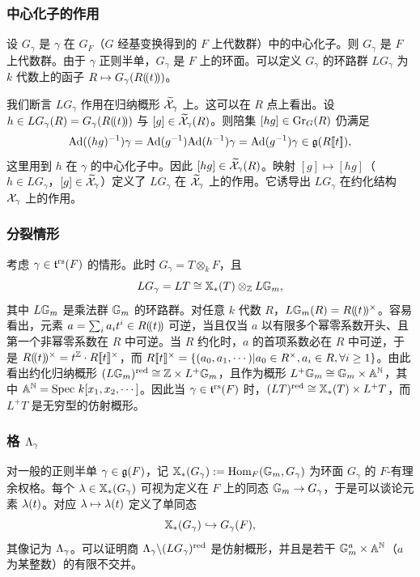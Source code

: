 \subsubsection{中心化子的作用}\label{sss:centralizer} 设 $G_{\gamma}$ 是 $\gamma$ 在 $G_{F}$（$G$ 经基变换得到的 $F$ 上代数群）中的中心化子。则 $G_{\gamma}$ 是 $F$ 上代数群。由于 $\gamma$ 正则半单，$G_{\gamma}$ 是 $F$ 上的环面。可以定义 $G_{\gamma}$ 的环路群 $LG_{\gamma}$ 为 $k$ 代数上的函子 $R\mapsto G_{\gamma}(R(\!(t)\!))$。

我们断言 $LG_{\gamma}$ 作用在归纳概形 $\widetilde{\mathcal{X}}_{\gamma}$ 上。这可以在 $R$ 点上看出。设 $h\in LG_{\gamma}(R)=G_{\gamma}(R(\!(t)\!))$ 与 $[g]\in \widetilde{\mathcal{X}}_{\gamma}(R)$。则陪集 $[hg]\in \textup{Gr}_{G}(R)$ 仍满足
\begin{equation*}
\textup{Ad}((hg)^{-1})\gamma=\textup{Ad}(g^{-1})\textup{Ad}(h^{-1})\gamma=\textup{Ad}(g^{-1})\gamma\in\mathfrak{g}(R[\![t]\!]),
\end{equation*}
这里用到 $h$ 在 $\gamma$ 的中心化子中。因此 $[hg]\in \widetilde{\mathcal{X}}_{\gamma}(R)$。映射 $[g]\mapsto [hg]$（$h\in LG_{\gamma}$，$[g]\in\widetilde{\mathcal{X}}_{\gamma}$）定义了 $LG_{\gamma}$ 在 $\widetilde{\mathcal{X}}_{\gamma}$ 上的作用。它诱导出 $LG_{\gamma}$ 在约化结构 $\mathcal{X}_{\gamma}$ 上的作用。

\subsubsection{分裂情形} 考虑 $\gamma\in\mathfrak{t}^{\textup{rs}}(F)$ 的情形。此时 $G_{\gamma}=T\otimes_{k}F$，且
\begin{equation*}
LG_{\gamma}=LT\cong\mathbb{X}_*(T)\otimes_{\mathbb{Z}}L\mathbb{G}_m,
\end{equation*}
其中 $L\mathbb{G}_m$ 是乘法群 $\mathbb{G}_m$ 的环路群。对任意 $k$ 代数 $R$，$L\mathbb{G}_m(R)=R(\!(t)\!)^{\times}$。容易看出，元素 $a=\sum_{i}a_{i}t^{i}\in R(\!(t)\!)$ 可逆，当且仅当 $a$ 以有限多个幂零系数开头、且第一个非幂零系数在 $R$ 中可逆。当 $R$ 约化时，$a$ 的首项系数必在 $R$ 中可逆，于是 $R(\!(t)\!)^{\times}=t^{\mathbb{Z}}\cdot R[\![t]\!]^{\times}$，而 $R[\![t]\!]^{\times}=\{(a_{0},a_{1},\cdots)|a_{0}\in R^{\times}, a_{i}\in R, \forall i\geq 1\}$。由此看出约化归纳概形 $(L\mathbb{G}_m)^{\textup{red}}\cong \mathbb{Z}\times L^{+}\mathbb{G}_m$，且作为概形 $L^{+}\mathbb{G}_m\cong \mathbb{G}_m\times\mathbb{A}^{\mathbb{N}}$，其中 $\mathbb{A}^{\mathbb{N}}=\textup{Spec}\  k[x_{1},x_{2},\cdots]$。因此当 $\gamma\in\mathfrak{t}^{\textup{rs}}(F)$ 时，$(LT)^{\textup{red}}\cong\mathbb{X}_*(T)\times L^{+}T$，而 $L^{+}T$ 是无穷型的仿射概形。

\subsubsection{格 $\Lambda_{\gamma}$}\label{sss:L gamma} 对一般的正则半单 $\gamma\in\mathfrak{g}(F)$，记 $\mathbb{X}_*(G_{\gamma}):=\textup{Hom}_{F}(\mathbb{G}_m,G_{\gamma})$ 为环面 $G_{\gamma}$ 的 $F$-有理余权格。每个 $\lambda\in\mathbb{X}_*(G_{\gamma})$ 可视为定义在 $F$ 上的同态 $\mathbb{G}_m\to G_{\gamma}$，于是可以谈论元素 $\lambda(t)$。对应 $\lambda\mapsto \lambda(t)$ 定义了单同态
\begin{equation*}
\mathbb{X}_*(G_{\gamma})\hookrightarrow G_{\gamma}(F),
\end{equation*}
其像记为 $\Lambda_{\gamma}$。可以证明商 $\Lambda_{\gamma}\backslash (LG_{\gamma})^{\textup{red}}$ 是仿射概形，并且是若干 $\mathbb{G}_m^{a}\times \mathbb{A}^{\mathbb{N}}$（$a$ 为某整数）的有限不交并。

